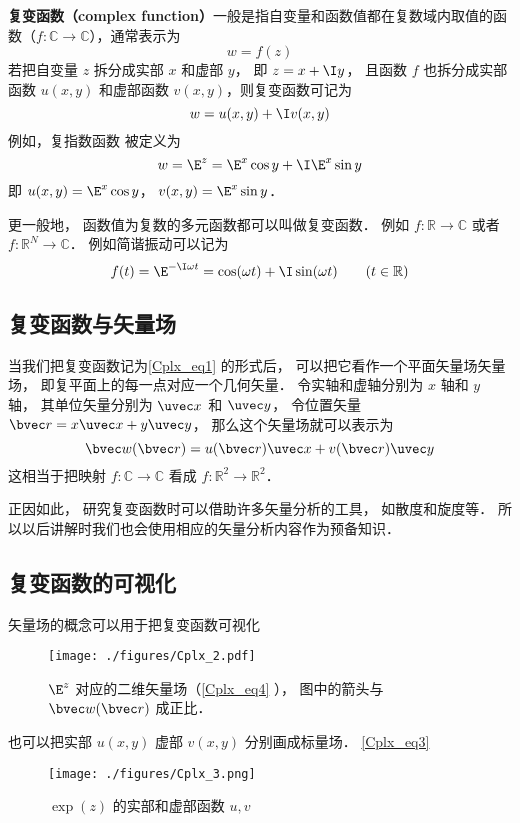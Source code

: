 
\textbf{复变函数（complex function）}一般是指自变量和函数值都在复数域内取值的函数（$f:\mathbb C \to \mathbb C$），通常表示为
\begin{equation}
w = f(z)
\end{equation}
若把自变量 $z$ 拆分成实部 $x$ 和虚部 $y$， 即 $z = x + \I y$， 且函数 $f$ 也拆分成实部函数 $u(x,y)$ 和虚部函数 $v(x,y)$，则复变函数可记为
\begin{equation}\label{Cplx_eq1}
w = u(x,y) + \I v(x,y)
\end{equation}
例如，复指数函数 被定义为
\begin{equation}\label{Cplx_eq3}
w = \E^z = \E^x \cos y + \I \E^x\sin y
\end{equation}
即 $u(x, y) = \E^x \cos y$， $v(x, y) = \E^x \sin y$．

更一般地， 函数值为复数的多元函数都可以叫做复变函数． 例如 $f: \mathbb R \to \mathbb C$ 或者 $f:\mathbb R^N \to \mathbb C$． 例如简谐振动可以记为
\begin{equation}
f(t) = \E^{-\I \omega t} = \cos(\omega t) + \I \sin(\omega t) \qquad (t \in \mathbb R)
\end{equation}

\subsection{复变函数与矢量场}
当我们把复变函数记为\autoref{Cplx_eq1} 的形式后， 可以把它看作一个平面矢量场矢量场， 即复平面上的每一点对应一个几何矢量． 令实轴和虚轴分别为 $x$ 轴和 $y$ 轴， 其单位矢量分别为 $\uvec x$ 和 $\uvec y$， 令位置矢量 $\bvec r = x \uvec x + y \uvec y$， 那么这个矢量场就可以表示为
\begin{equation}\label{Cplx_eq4}
\bvec w(\bvec r) = u(\bvec r) \uvec x + v(\bvec r) \uvec y
\end{equation}
这相当于把映射 $f:\mathbb C \to \mathbb C$ 看成 $f: \mathbb R^2 \to \mathbb R^2$．

正因如此， 研究复变函数时可以借助许多矢量分析的工具， 如散度和旋度等． 所以以后讲解时我们也会使用相应的矢量分析内容作为预备知识．

\subsection{复变函数的可视化}
矢量场的概念可以用于把复变函数可视化
\begin{figure}[ht]
\centering
\texttt{[image: ./figures/Cplx\_2.pdf]}
\caption{$\E^z$ 对应的二维矢量场（\autoref{Cplx_eq4} ）， 图中的箭头与 $\bvec w(\bvec r)$ 成正比．} \label{Cplx_fig2}
\end{figure}
也可以把实部 $u(x,y)$ 虚部 $v(x, y)$ 分别画成标量场． \autoref{Cplx_eq3}
\begin{figure}[ht]
\centering
\texttt{[image: ./figures/Cplx\_3.png]}
\caption{$\exp(z)$ 的实部和虚部函数 $u, v$} \label{Cplx_fig3}
\end{figure}


